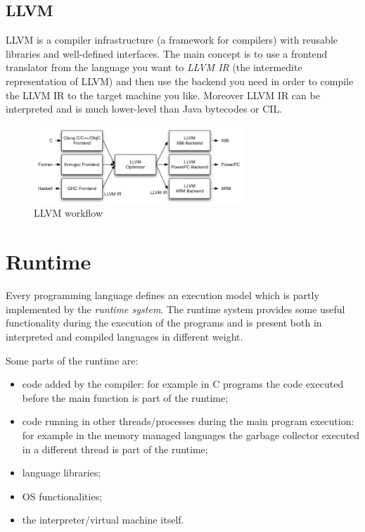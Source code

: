 \subsection{LLVM}
LLVM is a compiler infrastructure (a framework for compilers) with reusable libraries and well-defined interfaces.
The main concept is to use a frontend translator from the language you want to \emph{LLVM IR} (the intermedite representation of LLVM) and then use the backend you need in order to compile the LLVM IR to the target machine you like.
Moreover LLVM IR can be interpreted and is much lower-level than Java bytecodes or CIL.

\begin{figure}[H]
    \centering
    \includegraphics[width=300px]{images/1_Introduction/LLVM.png}
    \caption{LLVM workflow}
\end{figure}

\section{Runtime}
Every programming language defines an execution model which is partly implemented by the \emph{runtime system}.
The runtime system provides some useful functionality during the execution of the programs and is present both in interpreted and compiled languages in different weight.

Some parts of the runtime are:
\begin{itemize}
    \item code added by the compiler: for example in C programs the code executed before the main function is part of the runtime;
    \item code running in other threads/processes during the main program execution: for example in the memory managed languages the garbage collector executed in a different thread is part of the runtime;
    \item language libraries;
    \item OS functionalities;
    \item the interpreter/virtual machine itself.
\end{itemize}

